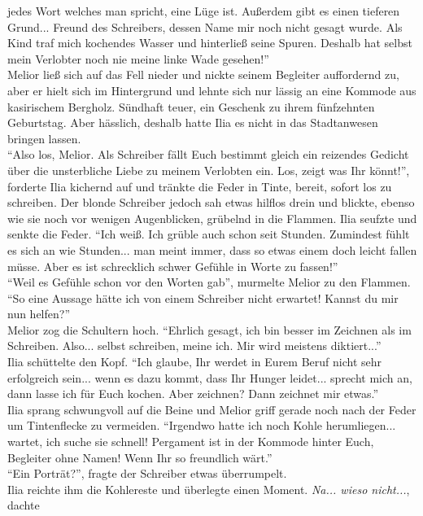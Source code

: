 jedes Wort welches man spricht, eine Lüge ist. Außerdem gibt es einen tieferen Grund... Freund des 
Schreibers, dessen Name mir noch nicht gesagt wurde. Als Kind traf mich kochendes Wasser und 
hinterließ seine Spuren. Deshalb hat selbst mein Verlobter noch nie meine linke Wade gesehen!''\\
Melior ließ sich auf das Fell nieder und nickte seinem Begleiter auffordernd zu, aber er hielt sich 
im Hintergrund und lehnte sich nur lässig an eine Kommode aus kasirischem Bergholz. Sündhaft teuer, 
ein Geschenk zu ihrem fünfzehnten Geburtstag. Aber hässlich, deshalb hatte Ilia es nicht in das 
Stadtanwesen bringen lassen.\\
``Also los, Melior. Als Schreiber fällt Euch bestimmt gleich ein reizendes Gedicht über die 
unsterbliche Liebe zu meinem Verlobten ein. Los, zeigt was Ihr könnt!'', forderte Ilia kichernd auf 
und tränkte die Feder in Tinte, bereit, sofort los zu schreiben. Der blonde Schreiber jedoch sah 
etwas hilflos drein und blickte, ebenso wie sie noch vor wenigen Augenblicken, grübelnd in die 
Flammen. Ilia seufzte und senkte die Feder. ``Ich weiß. Ich grüble auch schon seit Stunden. 
Zumindest fühlt es sich an wie Stunden... man meint immer, dass so etwas einem doch leicht fallen 
müsse. Aber es ist schrecklich schwer Gefühle in Worte zu fassen!'' \\
``Weil es Gefühle schon vor den Worten gab'', murmelte Melior zu den Flammen.\\
``So eine Aussage hätte ich von einem Schreiber nicht erwartet! Kannst du mir nun helfen?''\\
Melior zog die Schultern hoch. ``Ehrlich gesagt, ich bin besser im Zeichnen als im Schreiben. 
Also... selbst schreiben, meine ich. Mir wird meistens diktiert...''\\
Ilia schüttelte den Kopf. ``Ich glaube, Ihr werdet in Eurem Beruf nicht sehr erfolgreich sein... 
wenn es dazu kommt, dass Ihr Hunger leidet... sprecht mich an, dann lasse ich für Euch kochen. Aber 
zeichnen? Dann zeichnet mir etwas.''\\
Ilia sprang schwungvoll auf die Beine und Melior griff gerade noch nach der Feder um Tintenflecke 
zu vermeiden. ``Irgendwo hatte ich noch Kohle herumliegen... wartet, ich suche sie schnell! 
Pergament ist in der Kommode hinter Euch, Begleiter ohne Namen! Wenn Ihr so freundlich wärt.''\\
``Ein Porträt?'', fragte der Schreiber etwas überrumpelt.\\
Ilia reichte ihm die Kohlereste und überlegte einen Moment. \textit{Na... wieso nicht...}, dachte 

